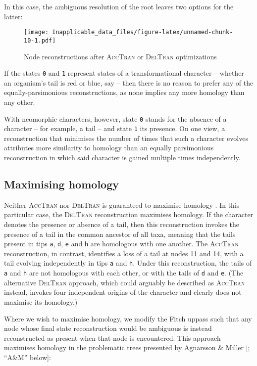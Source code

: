 \documentclass[]{book}
\theoremstyle{definition}
\theoremstyle{definition}
\theoremstyle{definition}
\theoremstyle{remark}
\begin{document}
In this case, the ambiguous resolution of the root leaves two options
for the latter:




\begin{figure}
\centering
\texttt{[image: Inapplicable\_data\_files/figure-latex/unnamed-chunk-10-1.pdf]}
\caption{\label{fig:unnamed-chunk-10}Node reconstructions after \textsc{AccTran} or
\textsc{DelTran} optimizations}
\end{figure}

If the states \texttt{0} and \texttt{1} represent states of a
transformational character -- whether an organism's tail is red or blue,
say -- then there is no reason to prefer any of the equally-parsimonious
reconstructions, as none implies any more homology than any other.

With neomorphic characters, however, state \texttt{0} stands for the
absence of a character -- for example, a tail -- and state \texttt{1}
its presence. On one view, a reconstruction that minimises the number of
times that such a character evolves attributes more similarity to
homology than an equally parsimonious reconstruction in which said
character is gained multiple times independently.

\hypertarget{maximising-homology}{%
\subsection{Maximising homology}\label{maximising-homology}}

Neither \textsc{AccTran} nor \textsc{DelTran} is guaranteed to maximise
homology \citep{Agnarsson2008}. In this particular case, the
\textsc{DelTran} reconstruction maximises homology. If the character
denotes the presence or absence of a tail, then this reconstruction
invokes the presence of a tail in the common ancestor of all taxa,
meaning that the tails present in tips \texttt{a}, \texttt{d},
\texttt{e} and \texttt{h} are homologous with one another. The
\textsc{AccTran} reconstruction, in contrast, identifies a loss of a
tail at nodes 11 and 14, with a tail evolving independently in tips
\texttt{a} and \texttt{h}. Under this reconstruction, the tails of
\texttt{a} and \texttt{h} are not homologous with each other, or with
the tails of \texttt{d} and \texttt{e}. (The alternative
\textsc{DelTran} approach, which could arguably be described as
\textsc{AccTran} instead, invokes four independent origins of the
character and clearly does not maximise its homology.)

Where we wish to maximise homology, we modify the Fitch uppass such that
any node whose final state reconstruction would be ambiguous is instead
reconstructed as present when that node is encountered. This approach
maximises homology in the problematic trees presented by Agnarsson \&
Miller {[}\citeyearpar{Agnarsson2008}; ``A\&M'' below{]}:
\end{document}
